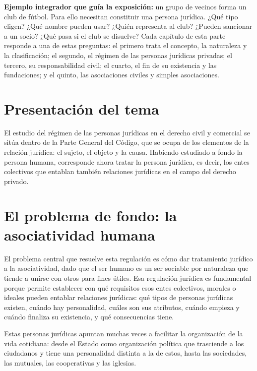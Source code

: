 \documentclass[12pt,oneside]{book}
\begin{document}
\textbf{Ejemplo integrador que guía la exposición:} un grupo de vecinos forma un club de fútbol. Para ello necesitan constituir una persona jurídica. ¿Qué tipo eligen? ¿Qué nombre pueden usar? ¿Quién representa al club? ¿Pueden sancionar a un socio? ¿Qué pasa si el club se disuelve? Cada capítulo de esta parte responde a una de estas preguntas: el primero trata el concepto, la naturaleza y la clasificación; el segundo, el régimen de las personas jurídicas privadas; el tercero, su responsabilidad civil; el cuarto, el fin de su existencia y las fundaciones; y el quinto, las asociaciones civiles y simples asociaciones.


\section{Presentación del tema}

El estudio del régimen de las personas jurídicas en el derecho civil y comercial se sitúa dentro de la Parte General del Código, que se ocupa de los elementos de la relación jurídica: el sujeto, el objeto y la causa. Habiendo estudiado a fondo la persona humana, corresponde ahora tratar la persona jurídica, es decir, los entes colectivos que entablan también relaciones jurídicas en el campo del derecho privado.

\section{El problema de fondo: la asociatividad humana}

El problema central que resuelve esta regulación es cómo dar tratamiento jurídico a la asociatividad, dado que el ser humano es un ser sociable por naturaleza que tiende a unirse con otros para fines útiles. Esa regulación jurídica es fundamental porque permite establecer con qué requisitos esos entes colectivos, morales o ideales pueden entablar relaciones jurídicas: qué tipos de personas jurídicas existen, cuándo hay personalidad, cuáles son sus atributos, cuándo empieza y cuándo finaliza su existencia, y qué consecuencias tiene.

Estas personas jurídicas apuntan muchas veces a facilitar la organización de la vida cotidiana: desde el Estado como organización política que trasciende a los ciudadanos y tiene una personalidad distinta a la de estos, hasta las sociedades, las mutuales, las cooperativas y las iglesias.
\end{document}
